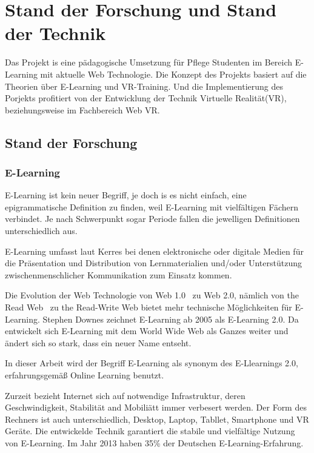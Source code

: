 \chapter{Stand der Forschung und Stand der Technik}

Das Projekt is eine pädagogische Umsetzung für Pflege Studenten im Bereich E-Learning mit aktuelle Web Technologie. Die Konzept des Projekts basiert auf die Theorien über E-Learning und VR-Training. Und die Implementierung des Porjekts profitiert von der Entwicklung der Technik Virtuelle Realität(VR), beziehungsweise im Fachbereich Web VR.

\section{Stand der Forschung}
 \subsection{E-Learning}
 E-Learning ist kein neuer Begriff, je doch is es nicht einfach, eine epigrammatische Definition zu finden, weil E-Learning mit vielfältigen Fächern verbindet. Je nach Schwerpunkt sogar Periode fallen die jewelligen Definitionen unterschiedlich aus.

E-Learning umfasst laut Kerres \citep{1} \glqq bei denen elektronische oder digitale Medien für die Präsentation und Distribution von Lernmaterialien und/oder Unterstützung zwischenmenschlicher Kommunikation zum Einsatz kommen.\grqq

Die Evolution der Web Technologie von \glqq Web 1.0 \grqq\ zu \glqq Web 2.0\grqq \citep{3}, nämlich von \glqq the Read Web \grqq\ zu \glqq the Read-Write Web\grqq \citep{4} bietet mehr technische Möglichkeiten für E-Learning. Stephen Downes \citep{2} zeichnet E-Learning ab 2005 als E-Learning 2.0. Da \glqq entwickelt sich E-Learning mit dem World Wide Web als Ganzes weiter und ändert sich so stark, dass ein neuer Name entseht.\grqq

In dieser Arbeit wird der Begriff E-Learning als synonym des E-Llearnings 2.0, erfahrungsgemäß Online Learning benutzt.
 
Zurzeit bezieht Internet sich auf notwendige Infrastruktur, deren Geschwindigkeit, Stabilität and Mobiliätt immer verbesert werden. Der Form des Rechners ist auch unterschiedlich, Desktop, Laptop, Tabllet, Smartphone und VR Geräte. Die entwickelde Technik garantiert die stabile und vielfältige Nutzung von E-Learning. Im Jahr 2013 haben 35\% der Deutschen E-Learning-Erfahrung.

